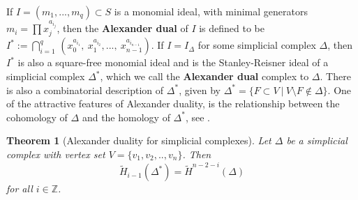 \documentclass[12pt,leqno]{amsart}
\newtheorem{theorem}[lemma]{Theorem}
\theoremstyle{definition}
\begin{document}
%
If $I = (m_1,...,m_q) \subset S$ is a monomial ideal, with minimal generators $m_i = \displaystyle \prod x_j^{a_{i_j}}$, then the \textbf{Alexander dual} of $I$ is defined to be $\displaystyle I^* := \bigcap_{i=1}^q\hspace{2pt} (x_0^{a_{i_1}},\ x_1^{a_{i_2}},...,\ x_{n-1}^{a_{i_{n-1}}})$. If $I = I_\Delta$ for some simplicial complex $\Delta$, then $I^*$ is also a square-free monomial ideal and is the Stanley-Reisner ideal of a simplicial complex $\Delta^*$, which we call the \textbf{Alexander dual} complex to $\Delta$. There is also a combinatorial description of $\Delta^*$, given by $\Delta^* = \{ F \subset V \ | \ V \setminus F \not \in \Delta \}$. One of the attractive features of Alexander duality, is the relationship between the cohomology of $\Delta$ and the homology of $\Delta^*$, see \cite[Theorem 5.6]{MS}.
%
\begin{theorem}[Alexander duality for simplicial complexes]\label{Combinatorial Alexander duality}
  Let $\Delta$ be a simplicial complex with vertex set $V = \{v_1,v_2,..,v_n \}$. Then
  \begin{displaymath}
    \widetilde{H}_{i-1}(\Delta^*) = \widetilde{H}^{n-2-i}(\Delta)
  \end{displaymath}
  for all $i \in \mathbb Z$.
\end{theorem}
% 
\end{document}
